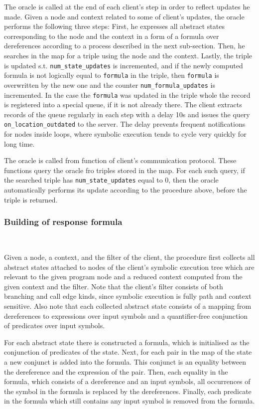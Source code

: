 \documentclass[envcountsame]{llncs}
\begin{document}
The oracle is called at the end of each client's step in order to reflect
updates he made. Given a node and context related to some of client's updates,
the oracle performs the following three steps: First, he expresses all abstract
states corresponding to the node and the context in a form of a formula over
dereferences according to a process described in the next sub-section. Then, he
searches in the map for a triple using the node and the context. Lastly, the
triple is updated s.t. \texttt{num\_state\_updates} is incremented, and if the
newly computed formula is not logically equal to \texttt{formula} in the triple,
then \texttt{formula} is overwritten by the new one and the counter
\texttt{num\_formula\_updates} is incremented. In the case the \texttt{formula}
was updated in the triple whole the record is registered into a special queue,
if it is not already there. The client extracts records of the queue regularly
in each step with a delay 10s and issues the query
\texttt{on\_location\_outdated} to the server. The delay prevents frequent
notifications for nodes inside loops, where symbolic execution tends to cycle
very quickly for long time.

The oracle is called from function of client's communication protocol. These
functions query the oracle fro triples stored in the map. For each such query,
if the searched triple has \texttt{num\_state\_updates} equal to 0, then the
oracle automatically performs its update according to the procedure above,
before the triple is returned.

\subsubsection{Building of response formula}~\\
\label{sec:BuildingResponseFormulaSE}

Given a node, a context, and the filter of the client, the procedure first
collects all abstract states attached to nodes of the client's symbolic
execution tree which are relevant to the given program node and a reduced
context computed from the given context and the filter. Note that the client's
filter consists of both branching and call edge kinds, since symbolic execution
is fully path and context sensitive. Also note that each collected abstract
state consists of a mapping from dereferences to expressions over input symbols
and a quantifier-free conjunction of predicates over input symbols.

For each abstract state there is constructed a formula, which is initialised as
the conjunction of predicates of the state. Next, for each pair in the map of
the state a new conjunct is added into the formula. This conjunct is an equality
between the dereference and the expression of the pair. Then, each equality in
the formula, which consists of a dereference and an input symbols, all
occurrences of the symbol in the formula is replaced by the dereferences.
Finally, each predicate in the formula which still contains any input symbol is
removed from the formula.
\end{document}
